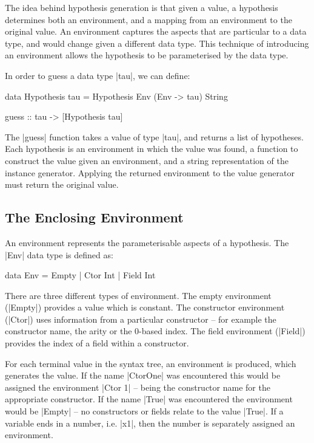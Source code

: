 \documentclass{llncs}
\begin{document}
The idea behind hypothesis generation is that given a value, a hypothesis determines both an environment, and a mapping from an environment to the original value. An environment captures the aspects that are particular to a data type, and would change given a different data type. This technique of introducing an environment allows the hypothesis to be parameterised by the data type.

In order to guess a data type |tau|, we can define:

\begin{code}
data Hypothesis tau = Hypothesis Env (Env -> tau) String

guess :: tau -> [Hypothesis tau]
\end{code}

The |guess| function takes a value of type |tau|, and returns a list of hypotheses. Each hypothesis is an environment in which the value was found, a function to construct the value given an environment, and a string representation of the instance generator. Applying the returned environment to the value generator must return the original value.


\subsection{The Enclosing Environment}
\label{sec:environment}

An environment represents the parameterisable aspects of a hypothesis. The |Env| data type is defined as:

\begin{code}
data Env = Empty | Ctor Int | Field Int
\end{code}

There are three different types of environment. The empty environment (|Empty|) provides a value which is constant. The constructor environment (|Ctor|) uses information from a particular constructor -- for example the constructor name, the arity or the 0-based index. The field environment (|Field|) provides the index of a field within a constructor.

For each terminal value in the syntax tree, an environment is produced, which generates the value. If the name |CtorOne| was encountered this would be assigned the environment |Ctor 1| -- being the constructor name for the appropriate constructor. If the name |True| was encountered the environment would be |Empty| -- no constructors or fields relate to the value |True|. If a variable ends in a number, i.e. |x1|, then the number is separately assigned an environment.
\end{document}
